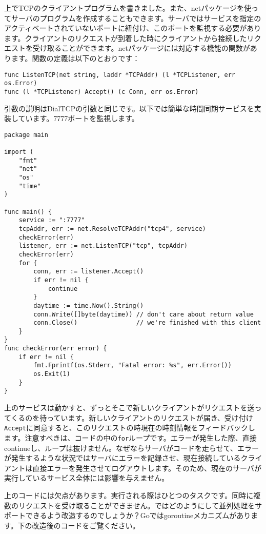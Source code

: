 上でTCPのクライアントプログラムを書きました。また、netパッケージを使ってサーバのプログラムを作成することもできます。サーバではサービスを指定のアクティベートされていないポートに紐付け、このポートを監視する必要があります。クライアントのリクエストが到着した時にクライアントから接続したリクエストを受け取ることができます。netパッケージには対応する機能の関数があります。関数の定義は以下のとおりです：

\begin{lstlisting}[numbers=none]
func ListenTCP(net string, laddr *TCPAddr) (l *TCPListener, err os.Error)
func (l *TCPListener) Accept() (c Conn, err os.Error)
\end{lstlisting}

引数の説明はDialTCPの引数と同じです。以下では簡単な時間同期サービスを実装しています。7777ポートを監視します。

\begin{lstlisting}[numbers=none]
package main

import (
    "fmt"
    "net"
    "os"
    "time"
)

func main() {
    service := ":7777"
    tcpAddr, err := net.ResolveTCPAddr("tcp4", service)
    checkError(err)
    listener, err := net.ListenTCP("tcp", tcpAddr)
    checkError(err)
    for {
        conn, err := listener.Accept()
        if err != nil {
            continue
        }
        daytime := time.Now().String()
        conn.Write([]byte(daytime)) // don't care about return value
        conn.Close()                // we're finished with this client
    }
}
func checkError(err error) {
    if err != nil {
        fmt.Fprintf(os.Stderr, "Fatal error: %s", err.Error())
        os.Exit(1)
    }
}
\end{lstlisting}

上のサービスは動かすと、ずっとそこで新しいクライアントがリクエストを送ってくるのを待っています。新しいクライアントのリクエストが届き、受け付け\texttt{Accept}に同意すると、このリクエストの時現在の時刻情報をフィードバックします。注意すべきは、コードの中の\texttt{for}ループです。エラーが発生した際、直接continueし、ループは抜けません。なぜならサーバがコードを走らせて、エラーが発生するような状況ではサーバにエラーを記録させ、現在接続しているクライアントは直接エラーを発生させてログアウトします。そのため、現在のサーバが実行しているサービス全体には影響を与えません。

上のコードには欠点があります。実行される際はひとつのタスクです。同時に複数のリクエストを受け取ることができません。ではどのようにして並列処理をサポートできるよう改造するのでしょうか？Goではgoroutineメカニズムがあります。下の改造後のコードをご覧ください。


